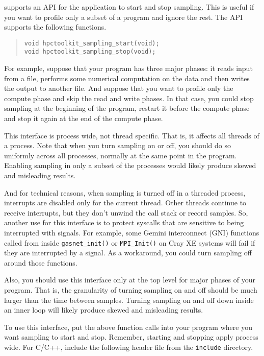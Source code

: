 \HPCToolkit{} supports an API for the application to start and stop
sampling.  This is useful if you want to profile only a subset of a
program and ignore the rest.  The API supports the following
functions.

\begin{quote}
\begin{verbatim}
void hpctoolkit_sampling_start(void);
void hpctoolkit_sampling_stop(void);
\end{verbatim}
\end{quote}

For example, suppose that your program has three major phases: it
reads input from a file, performs some numerical computation on the
data and then writes the output to another file.  And suppose that you
want to profile only the compute phase and skip the read and write
phases.  In that case, you could stop sampling at the beginning of the
program, restart it before the compute phase and stop it again at the
end of the compute phase.

This interface is process wide, not thread specific.  That is, it
affects all threads of a process.  Note that when you turn sampling on
or off, you should do so uniformly across all processes, normally at
the same point in the program.  Enabling sampling in only a subset of
the processes would likely produce skewed and misleading results.

And for technical reasons, when sampling is turned off in a threaded
process, interrupts are disabled only for the current thread.  Other
threads continue to receive interrupts, but they don't unwind the call
stack or record samples.  So, another use for this interface is to
protect syscalls that are sensitive to being interrupted with signals.
For example, some Gemini interconnect (GNI) functions called from
inside \verb|gasnet_init()| or \verb|MPI_Init()| on Cray XE systems
will fail if they are interrupted by a signal.  As a workaround, you
could turn sampling off around those functions.

Also, you should use this interface only at the top level for major
phases of your program.  That is, the granularity of turning sampling
on and off should be much larger than the time between samples.
Turning sampling on and off down inside an inner loop will likely
produce skewed and misleading results.

To use this interface, put the above function calls into your program
where you want sampling to start and stop.  Remember, starting and
stopping apply process wide.  For C/C++, include the following header
file from the \HPCToolkit{} {\tt include} directory.

